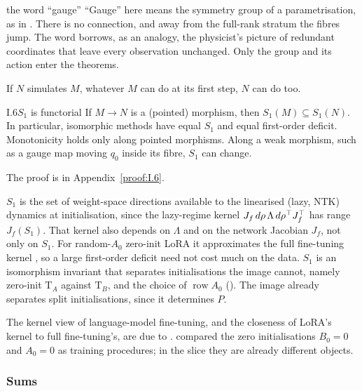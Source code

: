 \begin{remark*}{the word ``gauge''}
``Gauge'' here means the symmetry group of a parametrisation, as in . There is no connection, and
away from the full-rank stratum the fibres jump. The word borrows, as an analogy, the physicist's picture of redundant
coordinates that leave every observation unchanged. Only the group and its action enter the theorems.
\end{remark*}

If $N$ simulates $M$, whatever $M$ can do at its first step, $N$ can do too.

\begin{observation}{I.6}{$S_1$ is functorial}
If $M\to N$ is a (pointed) morphism, then $S_1(M)\subseteq S_1(N)$. In particular, isomorphic methods have equal $S_1$ and
equal first-order deficit. Monotonicity holds only along pointed morphisms. Along a weak morphism, such as a gauge map
moving $q_0$ inside its fibre, $S_1$ can change.
\end{observation}

\noindent The proof is in Appendix~\ref{proof:I.6}.

\begin{explains}
$S_1$ is the set of weight-space directions available to the linearised (lazy, NTK) dynamics at initialisation, since the
lazy-regime kernel $J_f\,d\rho\,\Lambda\,d\rho^{\top} J_f^{\top}$ has range $J_f(S_1)$. That kernel also depends on $\Lambda$ and on
the network Jacobian $J_f$, not only on $S_1$. For random-$A_0$ zero-init LoRA it approximates the full fine-tuning kernel
\citep{malladi2022kernel}, so a large first-order deficit need not cost much on the data. $S_1$ is an isomorphism
invariant that separates initialisations the image cannot, namely zero-init $\mathrm T_A$ against $\mathrm T_B$, and the
choice of $\operatorname{row}A_0$ (). The image already separates split initialisations, since it
determines $P$.
\end{explains}

The kernel view of language-model fine-tuning, and the closeness of LoRA's kernel to full fine-tuning's, are due to
\citet{malladi2022kernel}. \citet{hayou2024impact} compared the zero initialisations $B_0=0$ and $A_0=0$ as training
procedures; in the slice they are already different objects.

\subsubsection{Sums}\label{sec:slice-sums}


